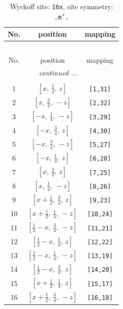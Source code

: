 \documentclass[fleqn,8pt]{jsarticle}
\begin{document}
\renewcommand{\arraystretch}{1.2}
\begin{longtable}{ccc}
\caption{Wyckoff site: {\tt 16x}, site symmetry: {\tt .m'.}}
 \\
 \hline \hline
No. & position & mapping \\ \hline \endfirsthead

\multicolumn{2}{l}{\tablename\ \thetable{}} \\
 \hline \hline
No. & position & mapping \\ \hline \endhead

 \hline \hline
\multicolumn{2}{r}{\footnotesize\it continued ...} \\ \endfoot

 \hline \hline
\multicolumn{2}{r}{} \\ \endlastfoot

1 & $\left[ x,\, \frac{1}{4},\, z \right]$ & {\tt [1,31]} \\ \hline
2 & $\left[ x,\, \frac{3}{4},\, - z \right]$ & {\tt [2,32]} \\ \hline
3 & $\left[ - x,\, \frac{1}{4},\, - z \right]$ & {\tt [3,29]} \\ \hline
4 & $\left[ - x,\, \frac{3}{4},\, z \right]$ & {\tt [4,30]} \\ \hline
5 & $\left[ - x,\, \frac{3}{4},\, - z \right]$ & {\tt [5,27]} \\ \hline
6 & $\left[ - x,\, \frac{1}{4},\, z \right]$ & {\tt [6,28]} \\ \hline
7 & $\left[ x,\, \frac{3}{4},\, z \right]$ & {\tt [7,25]} \\ \hline
8 & $\left[ x,\, \frac{1}{4},\, - z \right]$ & {\tt [8,26]} \\ \hline
9 & $\left[ x + \frac{1}{2},\, \frac{3}{4},\, z \right]$ & {\tt [9,23]} \\ \hline
10 & $\left[ x + \frac{1}{2},\, \frac{1}{4},\, - z \right]$ & {\tt [10,24]} \\ \hline
11 & $\left[ \frac{1}{2} - x,\, \frac{3}{4},\, - z \right]$ & {\tt [11,21]} \\ \hline
12 & $\left[ \frac{1}{2} - x,\, \frac{1}{4},\, z \right]$ & {\tt [12,22]} \\ \hline
13 & $\left[ \frac{1}{2} - x,\, \frac{1}{4},\, - z \right]$ & {\tt [13,19]} \\ \hline
14 & $\left[ \frac{1}{2} - x,\, \frac{3}{4},\, z \right]$ & {\tt [14,20]} \\ \hline
15 & $\left[ x + \frac{1}{2},\, \frac{1}{4},\, z \right]$ & {\tt [15,17]} \\ \hline
16 & $\left[ x + \frac{1}{2},\, \frac{3}{4},\, - z \right]$ & {\tt [16,18]} \\
\end{longtable}
\end{document}

